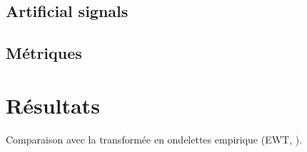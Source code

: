 \documentclass{gretsi}
\begin{document}
\subsection{Artificial signals}
\label{sub:}

\subsection{Métriques}
\label{sub:met}


\section{Résultats} 

Comparaison avec la transformée en ondelettes empirique (EWT, \cite{gilles_13_EWT}).\\



 
{}
\end{document}
